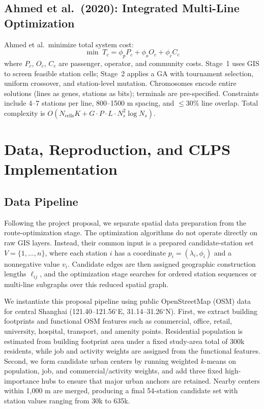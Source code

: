 \documentclass[conference]{IEEEtran}
\begin{document}
\subsection{Ahmed et al.\ (2020): Integrated Multi-Line Optimization}

Ahmed et al.\ minimize total system cost:
\begin{equation}
\min \; T_c = \phi_p P_c + \phi_o O_c + \phi_c C_c
\label{eq:ahmed_obj}
\end{equation}
where $P_c$, $O_c$, $C_c$ are passenger, operator, and community costs.
Stage~1 uses GIS to screen feasible station cells; Stage~2 applies a GA
with tournament selection, uniform crossover, and station-level mutation.
Chromosomes encode entire solutions (lines as genes, stations as bits);
terminals are pre-specified. Constraints include 4--7 stations per line,
800--1500 m spacing, and $\leq$30\% line overlap. Total complexity is
$O(N_{\text{cells}} K + G \cdot P \cdot L \cdot N_s^2 \log N_s)$.

\section{Data, Reproduction, and CLPS Implementation}

\subsection{Data Pipeline}

Following the project proposal, we separate spatial data preparation from
the route-optimization stage. The optimization algorithms do not operate
directly on raw GIS layers. Instead, their common input is a prepared
candidate-station set
$V=\{1,\ldots,n\}$, where each station $i$ has a coordinate
$p_i=(\lambda_i,\phi_i)$ and a nonnegative value $v_i$. Candidate edges are
then assigned geographic construction lengths $\ell_{ij}$, and the
optimization stage searches for ordered station sequences or multi-line
subgraphs over this reduced spatial graph.

We instantiate this proposal pipeline using public OpenStreetMap (OSM) data
for central Shanghai (121.40--121.56$^\circ$E, 31.14--31.26$^\circ$N).
First, we extract building footprints and functional OSM features such as
commercial, office, retail, university, hospital, transport, and amenity
points. Residential population is estimated from building footprint area
under a fixed study-area total of 300k residents, while job and activity
weights are assigned from the functional features. Second, we form candidate
urban centers by running weighted $k$-means on population, job, and
commercial/activity weights, and add three fixed high-importance hubs to
ensure that major urban anchors are retained. Nearby centers within
1,000 m are merged, producing a final 54-station candidate set with station
values ranging from 30k to 635k.
\end{document}
